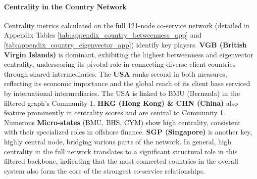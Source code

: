 \paragraph{Centrality in the Country Network}
Centrality metrics calculated on the full 121-node co-service network (detailed in Appendix Tables \ref{tab:appendix_country_betweenness_app} and \ref{tab:appendix_country_eigenvector_app}) identify key players.
\textbf{VGB (British Virgin Islands)} is dominant, exhibiting the highest betweenness and eigenvector centrality, underscoring its pivotal role in connecting diverse client countries through shared intermediaries. The \textbf{USA} ranks second in both measures, reflecting its economic importance and the global reach of its client base serviced by international intermediaries. The USA is linked to BMU (Bermuda) in the filtered graph's Community 1. \textbf{HKG (Hong Kong) \& CHN (China)} also feature prominently in centrality scores and are central to Community 1. Numerous \textbf{Micro-states} (BMU, BHS, CYM) show high centrality, consistent with their specialized roles in offshore finance. \textbf{SGP (Singapore)} is another key, highly central node, bridging various parts of the network. In general, high centrality in the full network translates to a significant structural role in this filtered backbone, indicating that the most connected countries in the overall system also form the core of the strongest co-service relationships.

